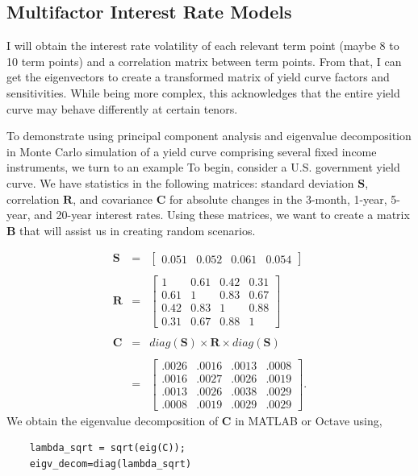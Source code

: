 \documentclass[11pt,twoside]{article}
\numberwithin{equation}{section}
\begin{document}
\subsection{Multifactor Interest Rate Models}\label{multifactor}
I will obtain the interest rate volatility of each relevant term point (maybe 8 to 10 term points) and a correlation matrix between term points. From that, I can get the eigenvectors to create a transformed matrix of yield curve factors and sensitivities. While being more complex, this acknowledges that the entire yield curve may behave differently at certain tenors.

To demonstrate using principal component analysis and eigenvalue decomposition in Monte Carlo simulation of a yield curve comprising several fixed income instruments, we turn to an example %
To begin, consider a U.S. government yield curve. We have statistics in the following matrices: standard deviation $\mathbf{S}$, correlation $\mathbf{R}$, and covariance $\mathbf{C}$ for absolute changes in the 3-month, 1-year, 5-year, and 20-year interest rates. Using these matrices, we want to create a matrix $\mathbf{B}$ that will assist us in creating random scenarios.

\begin{eqnarray*}
\mathbf{S} &=&
\begin{bmatrix}
	0.051 & 0.052 & 0.061 & 0.054
\end{bmatrix} \\
\\
\mathbf{R} &=&
\begin{bmatrix}
	1 & 0.61 & 0.42 & 0.31 \\
	0.61 & 1 & 0.83 & 0.67 \\
	0.42 & 0.83 & 1 & 0.88 \\
	0.31 & 0.67 & 0.88 & 1
\end{bmatrix} \\
\\
\mathbf{C} &=& diag(\mathbf{S}) \times \mathbf{R} \times diag(\mathbf{S}) \\
\\
&=&
\begin{bmatrix}
	.0026 & .0016 & .0013 & .0008 \\
	.0016 & .0027 & .0026 & .0019 \\
	.0013 & .0026 & .0038 & .0029 \\
	.0008 & .0019 & .0029 & .0029
\end{bmatrix}.
\end{eqnarray*}
We obtain the eigenvalue decomposition of $\mathbf{C}$ in MATLAB or Octave using,
\begin{verbatim}
    lambda_sqrt = sqrt(eig(C));
    eigv_decom=diag(lambda_sqrt)
\end{verbatim}
\end{document}
